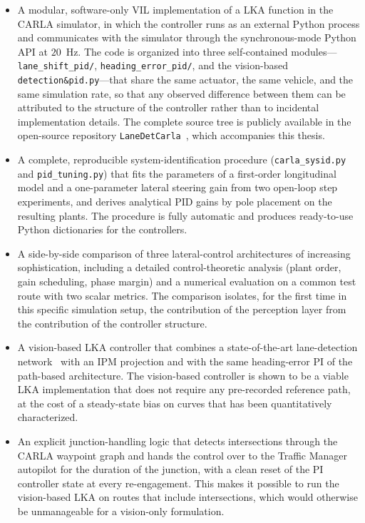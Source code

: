 \begin{itemize}
    \item A modular, software-only \ac{VIL} implementation of a \ac{LKA} function in the CARLA simulator, in which the controller runs as an external Python process and communicates with the simulator through the synchronous-mode Python API at $20$~Hz. The code is organized into three self-contained modules---\texttt{lane\_shift\_pid/}, \texttt{heading\_error\_pid/}, and the vision-based \texttt{detection\&pid.py}---that share the same actuator, the same vehicle, and the same simulation rate, so that any observed difference between them can be attributed to the structure of the controller rather than to incidental implementation details. The complete source tree is publicly available in the open-source repository \texttt{LaneDetCarla}~\cite{lanedetcarla}, which accompanies this thesis.
    \item A complete, reproducible system-identification procedure (\texttt{carla\_sysid.py} and \texttt{pid\_tuning.py}) that fits the parameters of a first-order longitudinal model and a one-parameter lateral steering gain from two open-loop step experiments, and derives analytical PID gains by pole placement on the resulting plants. The procedure is fully automatic and produces ready-to-use Python dictionaries for the controllers.
    \item A side-by-side comparison of three lateral-control architectures of increasing sophistication, including a detailed control-theoretic analysis (plant order, gain scheduling, phase margin) and a numerical evaluation on a common test route with two scalar metrics. The comparison isolates, for the first time in this specific simulation setup, the contribution of the perception layer from the contribution of the controller structure.
    \item A vision-based \ac{LKA} controller that combines a state-of-the-art lane-detection network~\cite{clrnet} with an \acs{IPM} projection and with the same heading-error PI of the path-based architecture. The vision-based controller is shown to be a viable \ac{LKA} implementation that does not require any pre-recorded reference path, at the cost of a steady-state bias on curves that has been quantitatively characterized.
    \item An explicit junction-handling logic that detects intersections through the CARLA waypoint graph and hands the control over to the Traffic Manager autopilot for the duration of the junction, with a clean reset of the PI controller state at every re-engagement. This makes it possible to run the vision-based \ac{LKA} on routes that include intersections, which would otherwise be unmanageable for a vision-only formulation.
\end{itemize}

